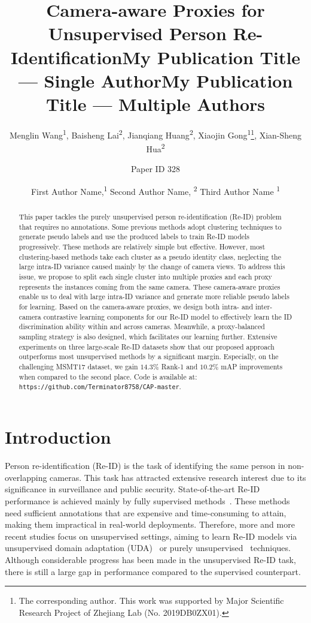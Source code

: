 \documentclass[letterpaper]{article} %
\title{Camera-aware Proxies for Unsupervised Person Re-Identification}
\author {
    Menglin Wang\textsuperscript{\rm 1}, Baisheng Lai\textsuperscript{\rm 2}, Jianqiang Huang\textsuperscript{\rm 2}, 
    Xiaojin Gong\textsuperscript{\rm 1}\thanks{The corresponding author. This work was supported by Major Scientific Research Project of Zhejiang Lab (No. 2019DB0ZX01).}, Xian-Sheng Hua\textsuperscript{\rm 2}
    \\
}
\title{My Publication Title --- Single Author}
\author {
    Paper ID 328
}
\title{My Publication Title --- Multiple Authors}
\author {

        First Author Name,\textsuperscript{\rm 1}
        Second Author Name, \textsuperscript{\rm 2}
        Third Author Name \textsuperscript{\rm 1} \\
}
\begin{document}

\maketitle

\begin{abstract}
This paper tackles the purely unsupervised person re-identification (Re-ID) problem that requires no annotations. Some previous methods adopt clustering techniques to generate pseudo labels and use the produced labels to train Re-ID models progressively. These methods are relatively simple but effective. However, most clustering-based methods take each cluster as a pseudo identity class, neglecting the large intra-ID variance caused mainly by the change of camera views. To address this issue, we propose to split each single cluster into multiple proxies and each proxy represents the instances coming from the same camera. These camera-aware proxies enable us to deal with large intra-ID variance and generate more reliable pseudo labels for learning. Based on the camera-aware proxies, we design both intra- and inter-camera contrastive learning components for our Re-ID model to effectively learn the ID discrimination ability within and across cameras. Meanwhile, a proxy-balanced sampling strategy is also designed, which facilitates our learning further. Extensive experiments on three large-scale Re-ID datasets show that our proposed approach outperforms most unsupervised methods by a significant margin. Especially, on the challenging MSMT17 dataset, we gain $14.3\%$ Rank-1 and $10.2\%$ mAP improvements when compared to the second place. 
Code is available at: \texttt{https://github.com/Terminator8758/CAP-master}. 
\end{abstract}




\section{Introduction}
Person re-identification (Re-ID) is the task of identifying the same person in non-overlapping cameras. This task has attracted extensive research interest due to its significance in surveillance and public security. State-of-the-art Re-ID performance is achieved mainly by fully supervised methods~\cite{sun2018beyond, chen2019abd}. These methods need sufficient annotations that are expensive and time-consuming to attain, making them impractical in real-world deployments. Therefore, more and more recent studies focus on unsupervised settings, aiming to learn Re-ID models via unsupervised domain adaptation (UDA)~\cite{Wei2018PTGAN,qi2019DA,zhong2019invariance} or purely unsupervised~\cite{lin2019aBottom,li2018unsupervised,wu2019graph} techniques. Although considerable progress has been made in the unsupervised Re-ID task, there is still a large gap in performance compared to the supervised counterpart.
 
\end{document}
